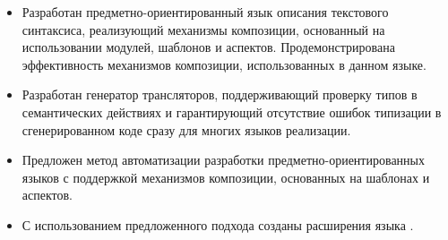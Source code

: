 \begin{itemize}
\item Разработан предметно-ориентированный язык описания текстового синтаксиса, реализующий механизмы композиции, основанный на использовании модулей, шаблонов и аспектов. Продемонстрирована эффективность механизмов композиции, использованных в данном языке.
\item Разработан генератор трансляторов, поддерживающий проверку типов в семантических действиях и гарантирующий отсутствие ошибок типизации в сгенерированном коде сразу для многих языков реализации.
\item Предложен метод автоматизации разработки предметно-ориентированных языков с поддержкой механизмов композиции, основанных на шаблонах и аспектов.
\item С использованием предложенного подхода созданы расширения языка .
\end{itemize}
